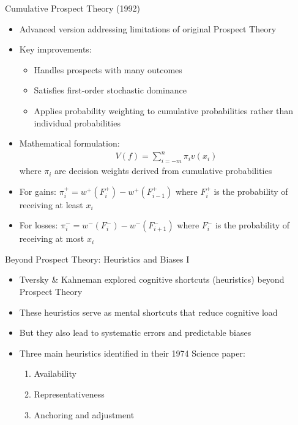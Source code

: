\documentclass[10pt]{beamer}
\begin{document}
\begin{frame}{Cumulative Prospect Theory (1992)}
  \begin{itemize}[<+->]
    \item Advanced version addressing limitations of original Prospect Theory
    \item Key improvements:
      \begin{itemize}
        \item Handles prospects with many outcomes
        \item Satisfies first-order stochastic dominance
        \item Applies probability weighting to cumulative probabilities rather than individual probabilities
      \end{itemize}
    \item Mathematical formulation:
      \begin{align*}
        V(f) = \sum_{i=-m}^{n} \pi_i v(x_i)
      \end{align*}
      where $\pi_i$ are decision weights derived from cumulative probabilities
    \item For gains: $\pi_i^+ = w^+(F_i^+) - w^+(F_{i-1}^+)$ where $F_i^+$ is the probability of receiving at least $x_i$
    \item For losses: $\pi_i^- = w^-(F_i^-) - w^-(F_{i+1}^-)$ where $F_i^-$ is the probability of receiving at most $x_i$
  \end{itemize}
\end{frame}

\begin{frame}{Beyond Prospect Theory: Heuristics and Biases I}
  \begin{itemize}[<+->]
    \item Tversky \& Kahneman explored cognitive shortcuts (heuristics) beyond Prospect Theory
    \item These heuristics serve as mental shortcuts that reduce cognitive load
    \item But they also lead to systematic errors and predictable biases
    \item Three main heuristics identified in their 1974 Science paper:
      \begin{enumerate}
        \item Availability
        \item Representativeness 
        \item Anchoring and adjustment
      \end{enumerate}
  \end{itemize}
\end{frame}
\end{document}
